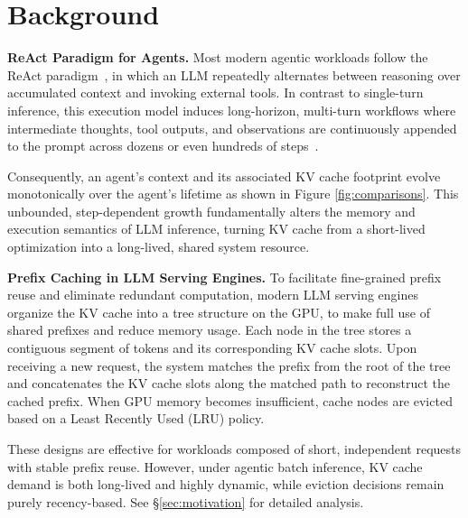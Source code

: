 \section{Background}



\noindent\textbf{ReAct Paradigm for Agents.}
Most modern agentic workloads follow the ReAct paradigm~\cite{react}, in which an LLM repeatedly alternates between reasoning over accumulated context and invoking external tools.
In contrast to single-turn inference, this execution model induces long-horizon, multi-turn workflows where intermediate thoughts, tool outputs, and observations are continuously appended to the prompt across dozens or even hundreds of steps~\cite{aflow,gptswarm,sppo}.


Consequently, an agent’s context and its associated KV cache footprint evolve monotonically over the agent’s lifetime as shown in Figure \ref{fig:comparisons}.
This unbounded, step-dependent growth fundamentally alters the memory and execution semantics of LLM inference, turning KV cache from a short-lived optimization into a long-lived, shared system resource.


\noindent\textbf{Prefix Caching in LLM Serving Engines.}
To facilitate fine-grained prefix reuse and eliminate redundant computation, modern LLM serving engines \cite{sglang,pagedattention} organize the KV cache into a tree structure on the GPU, to make full use of shared prefixes and reduce memory usage.  
Each node in the tree stores a contiguous segment of tokens and its corresponding KV cache slots.
Upon receiving a new request, the system matches the prefix from the root of the tree and concatenates the KV cache slots along the matched path to reconstruct the cached prefix.
When GPU memory becomes insufficient, cache nodes are evicted based on a Least Recently Used (LRU) policy.


These designs are effective for workloads composed of short, independent requests with stable prefix reuse.
However, under agentic batch inference, KV cache demand is both long-lived and highly dynamic, while eviction decisions remain purely recency-based. See \S\ref{sec:motivation} for detailed analysis.


